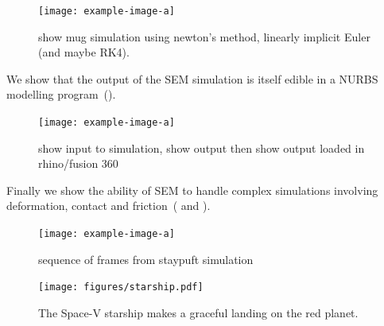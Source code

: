 \begin{figure}[h]
  \texttt{[image: example-image-a]}
  \caption{show mug simulation using newton's method, linearly implicit Euler (and maybe RK4). }
  \label{fig:time_integration}
\end{figure}

We show that the output of the SEM simulation is itself edible in a NURBS modelling program~().
\begin{figure}[h]
  \texttt{[image: example-image-a]}
  \caption{show input to simulation, show output then show output loaded in rhino/fusion 360 }
  \label{fig:edit}
\end{figure}

Finally we show the ability of SEM to handle complex simulations involving deformation, contact and friction~( and ).
\begin{figure}[htp]
  \texttt{[image: example-image-a]}
  \caption{sequence of frames from staypuft simulation}
  \label{fig:staypuft}
\end{figure}

\begin{figure}[htp]
  \texttt{[image: figures/starship.pdf]}
  \caption{The Space-V starship makes a graceful landing on the red planet. }
  \label{fig:f1}
\end{figure}
